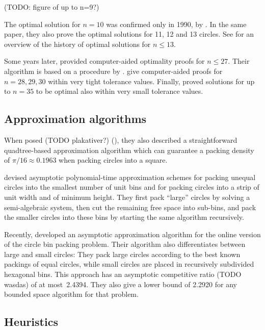 \documentclass[a4paper,style=print,oneside,bibliography=totoc,nexus,lnum,extramargin]{tubsbook}
\begin{document}
(TODO: figure of up to n=9?)

The optimal solution for $n = 10$ was confirmed only in 1990, by \textcite{DPW1990optimal}. In the same paper, they also prove the optimal solutions for 11, 12 and 13 circles.
See \textcite{WMP1994history} for an overview of the history of optimal solutions for $n \le 13$.

Some years later, \textcite{NO1998more} provided computer-aided optimality proofs for $n \le 27$. Their algorithm is based on a procedure by \textcite{PWMD1992packing}.
\textcite{MC2005new} give computer-aided proofs for $n=28,29,30$ within very tight tolerance values.
Finally, \textcite{LR2002packing} proved solutions for up to $n=35$ to be optimal also within very small tolerance values.

\subsection{Approximation algorithms}

When \textcite{DFL2010circle} posed (TODO plakativer?) (), they also described a straightforward quadtree-based approximation algorithm which can guarantee a packing density of $\pi/16 \approx 0.1963$ when packing circles into a square.

\textcite{MPSSW2014polynomial} devised asymptotic polynomial-time approximation schemes for packing unequal circles into the smallest number of unit bins and for packing circles into a strip of unit width and of minimum height. They first pack “large” circles by solving a semi-algebraic system, then cut the remaining free space into sub-bins, and pack the smaller circles into these bins by starting the same algorithm recursively.

Recently, \textcite{HMS2016bounded} developed an asymptotic approximation algorithm for the online version of the circle bin packing problem.
Their algorithm also differentiates between large and small circles: They pack large circles according to the best known packings of equal circles, while small circles are placed in recursively subdivided hexagonal bins. This approach has an asymptotic competitive ratio (TODO wasdas) of at most~2.4394. They also give a lower bound of 2.2920 for any bounded space algorithm for that problem.

\subsection{Heuristics}
\end{document}
